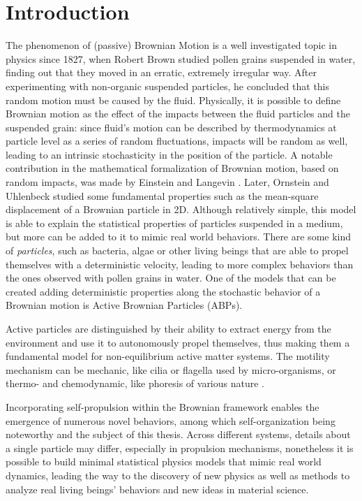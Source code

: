 \documentclass[../../master_thesis_np.tex]{subfiles}
\begin{document}
 
\chapter{Introduction}
	The phenomenon of (passive) Brownian Motion is a well investigated topic in physics since 1827, when Robert Brown studied pollen grains suspended in water, finding out that they moved in an erratic, extremely irregular way.
	After experimenting with non-organic suspended particles, he concluded that this random motion must be caused by the fluid.
	Physically, it is possible to define Brownian motion as the effect of the impacts between the fluid particles and the suspended grain: since fluid's motion can be described by thermodynamics at particle level as a series of random fluctuations, impacts will be random as well, leading to an intrinsic stochasticity in the position of the particle.
	A notable contribution in the mathematical formalization of Brownian motion, based on random impacts, was made by Einstein and Langevin \cite{gardiner_handbook_2004}. 
	Later, Ornstein and Uhlenbeck \cite{uhlenbeck_theory_1930} studied some fundamental properties such as the mean-square displacement of a Brownian particle in 2D.
	Although relatively simple, this model is able to explain the statistical properties of particles suspended in a medium, but more can be added to it to mimic real world behaviors. 
	There are some kind of \emph{particles}, such as bacteria, algae or other living beings that are able to propel themselves with a deterministic velocity, leading to more complex behaviors than the ones observed with pollen grains in water. 
	One of the models that can be created adding deterministic properties along the stochastic behavior of a Brownian motion is Active Brownian Particles (ABPs).
	
	Active particles are distinguished by their ability to extract energy from the environment and use it to autonomously propel themselves, thus making them a fundamental model for non-equilibrium active matter systems.	
	The motility mechanism can be mechanic, like cilia or flagella used by micro-organisms, or thermo- and chemodynamic, like phoresis of various nature \cite{moran_phoretic_2017}.
	
	Incorporating self-propulsion within the Brownian framework enables the emergence of numerous novel behaviors, among which self-organization being noteworthy and the subject of this thesis. 
	Across different systems, details about a single particle may differ, especially in propulsion mechanisms, nonetheless it is possible to build minimal statistical physics models that mimic real world dynamics, leading the way to the discovery of new physics as well as methods to analyze real living beings' behaviors and new ideas in material science. 
	
\end{document}
